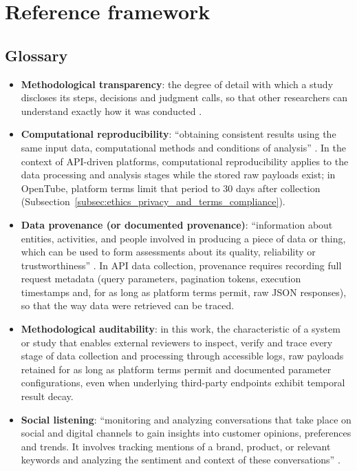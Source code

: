 \chapter{Reference framework}
\label{chap:reference_framework}

\section{Glossary}

\begin{itemize}
    \item \textbf{Methodological transparency}: the degree of detail with which a study discloses its steps, decisions and judgment calls, so that other researchers can understand exactly how it was conducted \autocite{aguinis2018transparency}.

    \item \textbf{Computational reproducibility}: \enquote{obtaining consistent results using the same input data, computational methods and conditions of analysis} \autocite{nasem2019reproducibility}. In the context of API-driven platforms, computational reproducibility applies to the data processing and analysis stages while the stored raw payloads exist; in OpenTube, platform terms limit that period to 30 days after collection (Subsection~\ref{subsec:ethics_privacy_and_terms_compliance}).

    \item \textbf{Data provenance (or documented provenance)}: \enquote{information about entities, activities, and people involved in producing a piece of data or thing, which can be used to form assessments about its quality, reliability or trustworthiness} \autocite{w3c_prov_overview}. In API data collection, provenance requires recording full request metadata (query parameters, pagination tokens, execution timestamps and, for as long as platform terms permit, raw JSON responses), so that the way data were retrieved can be traced.

    \item \textbf{Methodological auditability}: in this work, the characteristic of a system or study that enables external reviewers to inspect, verify and trace every stage of data collection and processing through accessible logs, raw payloads retained for as long as platform terms permit and documented parameter configurations, even when underlying third-party endpoints exhibit temporal result decay.

    \item \textbf{Social listening}: \enquote{monitoring and analyzing conversations that take place on social and digital channels to gain insights into customer opinions, preferences and trends. It involves tracking mentions of a brand, product, or relevant keywords and analyzing the sentiment and context of these conversations} \autocite{emplifi_sociallistening}.


\end{itemize}
